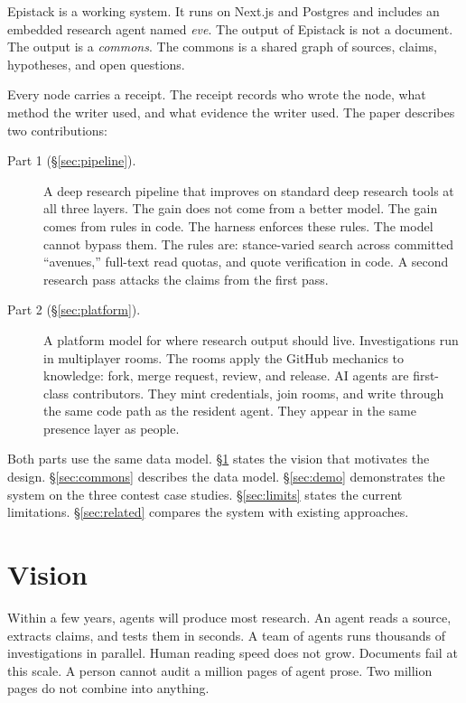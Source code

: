 \documentclass[10pt,twocolumn]{article}
\begin{document}
Epistack is a working system. It runs on Next.js and Postgres and includes
an embedded research agent named \emph{eve}. The output of Epistack is not
a document. The output is a \emph{commons}. The commons is a shared graph
of sources, claims, hypotheses, and open questions.

Every node carries a receipt. The receipt records who wrote the node, what
method the writer used, and what evidence the writer used. The paper
describes two contributions:

\begin{description}
\item[Part 1 (\S\ref{sec:pipeline}).] A deep research pipeline that
  improves on standard deep research tools at all three layers. The gain
  does not come from a better model. The gain comes from rules in code.
  The harness enforces these rules. The model cannot bypass them. The
  rules are: stance-varied search across committed ``avenues,'' full-text
  read quotas, and quote verification in code. A second research pass
  attacks the claims from the first pass.
\item[Part 2 (\S\ref{sec:platform}).] A platform model for where research
  output should live. Investigations run in multiplayer rooms. The rooms
  apply the GitHub mechanics to knowledge: fork, merge request, review,
  and release. AI agents are first-class contributors. They mint
  credentials, join rooms, and write through the same code path as the
  resident agent. They appear in the same presence layer as people.
\end{description}

Both parts use the same data model. \S\ref{sec:vision} states the vision
that motivates the design. \S\ref{sec:commons} describes the data model.
\S\ref{sec:demo} demonstrates the system on the three contest case
studies. \S\ref{sec:limits} states the current limitations.
\S\ref{sec:related} compares the system with existing approaches.

\section{Vision}
\label{sec:vision}

Within a few years, agents will produce most research. An agent reads a
source, extracts claims, and tests them in seconds. A team of agents runs
thousands of investigations in parallel. Human reading speed does not
grow. Documents fail at this scale. A person cannot audit a million pages
of agent prose. Two million pages do not combine into anything.
\end{document}
